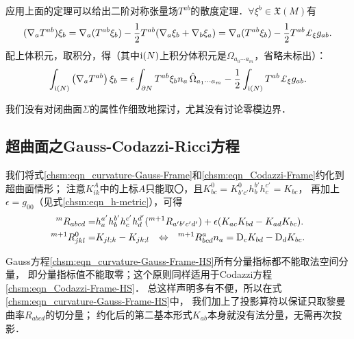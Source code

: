 应用上面的定理可以给出二阶对称张量场$T^{ab}$的散度定理．$\forall \xi^b \in \mathfrak{X}(M)$有
\begin{equation*}
      (\nabla_a T^{ab})\xi_b   %
    = \nabla_a(T^{ab} \xi_b ) - \frac{1}{2}T^{ab}( \nabla_a \xi_b +\nabla_b \xi_a )
    = \nabla_a(T^{ab} \xi_b ) - \frac{1}{2}T^{ab} \Lie_{\xi}g_{ab} .
\end{equation*}
配上体积元，取积分，得（其中${\rm i}(N)$上积分体积元是${\Omega}_{a_0 \cdots a_{m} }$，省略未标出）：
\begin{equation}\label{chsm:eqn_Gauss-Divergence-Tab}
    \int_{{\rm i}(N)} \left(\nabla_a T^{ab}\right) \xi_b  
    =\epsilon \int_{\partial N} T^{ab}\xi_b n_a \, \hat{\Omega}_{a_1 \cdots a_{m} }
    - \frac{1}{2}\int_{{\rm i} (N)} T^{ab} \Lie_{\xi}g_{ab} .
\end{equation}

我们没有对闭曲面$\Sigma$的属性作细致地探讨，尤其没有讨论零模边界．





\subsection{超曲面之Gauss-Codazzi-Ricci方程}
我们将式\eqref{chsm:eqn_curvature-Gauss-Frame}和\eqref{chsm:eqn_Codazzi-Frame}约化到超曲面情形；
注意$K^A_{ik}$中的上标$A$只能取〇，且$K^0_{bc}=K^0_{b'c'} h_b^{b'} h_c^{c'} = K_{bc}$，
再加上$\epsilon=g_{00}$（见式\eqref{chsm:eqn_h-metric}），可得
\begin{align}
    {}^{m}{R}_{abcd} =& %
    h_a^{a'}h_b^{b'}h_c^{c'}h_d^{d'} ({}^{m+1}{R}_{a' b' c' d' })
     +\epsilon (K_{ac}K_{bd} - K_{ad} K_{bc} ).
    \label{chsm:eqn_curvature-Gauss-Frame-HS} \\
    {}^{m+1}{R}^0_{jkl} =& K_{jl;k} -K_{jk;l} {\quad \Leftrightarrow \quad  }
    {}^{m+1}{R}^a_{bcd}{n}_a = {\rm D}_c K_{bd}- {\rm D}_d K_{bc} .
    \label{chsm:eqn_Codazzi-Frame-HS}
\end{align}



Gauss方程\eqref{chsm:eqn_curvature-Gauss-Frame-HS}所有分量指标都不能取法空间分量，
即分量指标值不能取零；这个原则同样适用于Codazzi方程\eqref{chsm:eqn_Codazzi-Frame-HS}．
总这样声明多有不便，所以在式\eqref{chsm:eqn_curvature-Gauss-Frame-HS}中，
我们加上了投影算符以保证只取黎曼曲率${R}_{abcd}$的切分量；
约化后的第二基本形式$K_{ab}$本身就没有法分量，无需再次投影．

